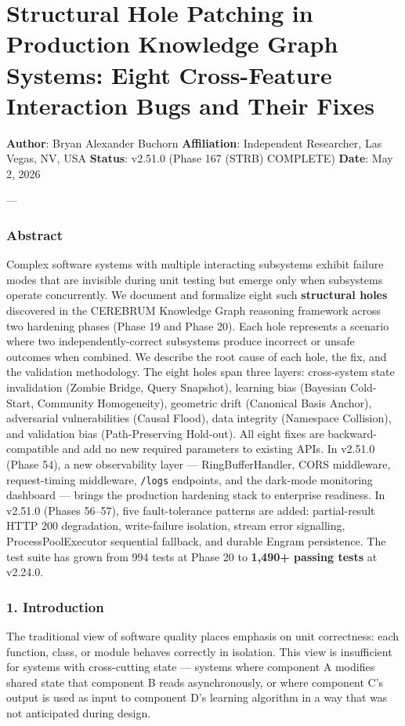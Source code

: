 \section{Structural Hole Patching in Production Knowledge Graph Systems: Eight Cross-Feature Interaction Bugs and Their Fixes}

\textbf{Author}: Bryan Alexander Buchorn  
\textbf{Affiliation}: Independent Researcher, Las Vegas, NV, USA  
\textbf{Status}: v2.51.0 (Phase 167 (STRB) COMPLETE)
\textbf{Date}: May 2, 2026

---

\subsubsection{Abstract}
Complex software systems with multiple interacting subsystems exhibit failure modes that are invisible during unit testing but emerge only when subsystems operate concu\-rrently. We document and formalize eight such \textbf{structural holes} discovered in the CEREBRUM Knowledge Graph reasoning framework across two hardening phases (Phase 19 and Phase 20). Each hole represents a scenario where two indep\-endently-correct subsystems produce incorrect or unsafe outcomes when combined. We describe the root cause of each hole, the fix, and the validation methodology. The eight holes span three layers: cross-system state inval\-idation (Zombie Bridge, Query Snapshot), learning bias (Bayesian Cold-Start, Community Homogeneity), geometric drift (Canonical Basis Anchor), adversarial vulne\-rabilities (Causal Flood), data integrity (Namespace Collision), and validation bias (Path-Preserving Hold-out). All eight fixes are backward-compatible and add no new required parameters to existing APIs. In v2.51.0 (Phase 54), a new obser\-vability layer — RingBufferHandler, CORS middleware, request-timing middleware, \texttt{/logs} endpoints, and the dark-mode monitoring dashboard — brings the production hardening stack to enterprise readiness. In v2.51.0 (Phases 56–57), five fault-tolerance patterns are added: partial-result HTTP 200 degradation, write-failure isolation, stream error signalling, ProcessPoolExecutor sequential fallback, and durable Engram persistence. The test suite has grown from 994 tests at Phase 20 to \textbf{1,490+ passing tests} at v2.24.0.

\subsubsection{1. Introd\-uction}
The traditional view of software quality places emphasis on unit correctness: each function, class, or module behaves correctly in isolation. This view is insuf\-ficient for systems with cross-cutting state — systems where component A modifies shared state that component B reads async\-hronously, or where component C's output is used as input to component D's learning algorithm in a way that was not anticipated during design.

